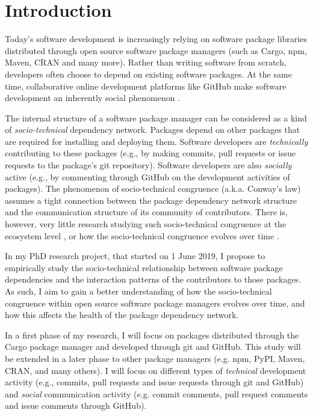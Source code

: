 

\section{Introduction}

Today's software development is increasingly relying on software package libraries distributed through open source software package managers (such as Cargo, npm, Maven, CRAN and many more). Rather than writing software from scratch, developers often choose to depend on existing software packages.
At the same time, collaborative online development platforms like GitHub make software development an inherently social phenomenon \cite{DabbishSTH12,Mens2019IEEESW}.

The internal structure of a software package manager can be considered as a kind of \emph{socio-technical} dependency network. Packages depend on other packages that are required for installing and deploying them. Software developers are \emph{technically} contributing to these packages (e.g., by making commits, pull requests or issue requests to the package's git repository). Software developers are also \emph{socially} active (e.g., by commenting through GitHub on the development activities of packages).
The phenomenon of socio-technical congruence (a.k.a. Conway's law) \cite{Conway1968, Herbsleb1999} assumes a tight connection between the package dependency network structure and the communication structure of its community of contributors. There is, however, very little research studying such socio-technical congruence at the ecosystem level \cite{Palyart2018TSE}, or how the socio-technical congruence evolves over time \cite{Cataldo2008}.

In my PhD research project, that started on 1 June 2019, I propose to empirically study the socio-technical relationship between software package dependencies and the interaction patterns of the contributors to those packages.
As such, I aim to gain a better understanding of how the socio-technical congruence within open source software package managers evolves over time, and how this affects the health of the package dependency network.

In a first phase of my research, I will focus on packages distributed through the Cargo package manager and developed through git and GitHub. This study will be extended in a later phase to other package managers (e.g. npm, PyPI, Maven, CRAN, and many others).
I will focus on different types of \emph{technical} development activity (e.g., commits, pull requests and issue requests through git and GitHub) and \emph{social} communication activity (e.g. commit comments, pull request comments and issue comments through GitHub). 

